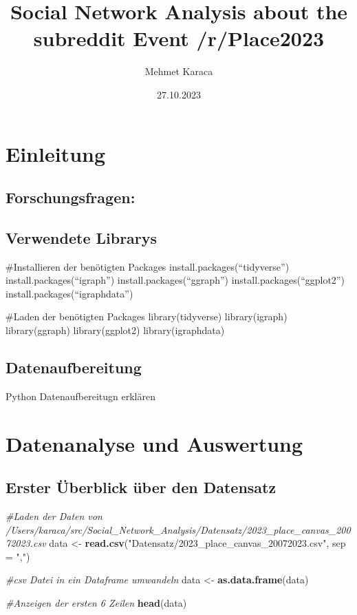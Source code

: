 \documentclass[
]{article}
\title{Social Network Analysis about the subreddit Event /r/Place2023}
\author{Mehmet Karaca}
\date{27.10.2023}
\newenvironment{Shaded}{\begin{snugshade}}{\end{snugshade}}
\newcommand{\AttributeTok}[1]{\textcolor[rgb]{0.13,0.29,0.53}{#1}}
\newcommand{\CommentTok}[1]{\textcolor[rgb]{0.56,0.35,0.01}{\textit{#1}}}
\newcommand{\FunctionTok}[1]{\textcolor[rgb]{0.13,0.29,0.53}{\textbf{#1}}}
\newcommand{\NormalTok}[1]{#1}
\newcommand{\OtherTok}[1]{\textcolor[rgb]{0.56,0.35,0.01}{#1}}
\newcommand{\StringTok}[1]{\textcolor[rgb]{0.31,0.60,0.02}{#1}}
\begin{document}
\maketitle

{
\setcounter{tocdepth}{2}
\tableofcontents
}

\section{Einleitung}\label{sec-einleitung}

\subsection{Forschungsfragen:}\label{sec-forschungsfragen}

\subsection{Verwendete Librarys}\label{sec-verwendete-librarys}

\#Installieren der benötigten Packages install.packages(``tidyverse'')
install.packages(``igraph'') install.packages(``ggraph'')
install.packages(``ggplot2'') install.packages(``igraphdata'')

\#Laden der benötigten Packages library(tidyverse) library(igraph)
library(ggraph) library(ggplot2) library(igraphdata)

\subsection{Datenaufbereitung}\label{datenaufbereitung}

Python Datenaufbereitugn erklären

\section{Datenanalyse und
Auswertung}\label{sec-datenanalyse-und-auswertung}

\subsection{Erster Überblick über den
Datensatz}\label{erster-uxfcberblick-uxfcber-den-datensatz}

\begin{Shaded}
\begin{Highlighting}[]
\CommentTok{\#Laden der Daten von  /Users/karaca/src/Social\_Network\_Analysis/Datensatz/2023\_place\_canvas\_20072023.csv}
\NormalTok{data }\OtherTok{\textless{}{-}} \FunctionTok{read.csv}\NormalTok{(}\StringTok{"Datensatz/2023\_place\_canvas\_20072023.csv"}\NormalTok{, }\AttributeTok{sep =} \StringTok{","}\NormalTok{)}

\CommentTok{\#csv Datei in ein Dataframe umwandeln}
\NormalTok{data }\OtherTok{\textless{}{-}} \FunctionTok{as.data.frame}\NormalTok{(data)}

\CommentTok{\#Anzeigen der ersten 6 Zeilen}
\FunctionTok{head}\NormalTok{(data)}
\end{Highlighting}
\end{Shaded}
\end{document}

